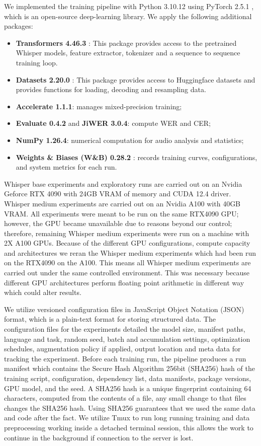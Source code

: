 {We implemented the training pipeline with Python 3.10.12 using PyTorch 2.5.1 \citep{Paszke2019}, which is an open-source deep-learning library. 
We apply the following additional packages:
\begin{itemize}
    \item \textbf{Transformers 4.46.3} \citep{Wolf2020}: This package provides access to the pretrained Whisper models, feature extractor, tokenizer and a sequence to sequence training loop.
    \item \textbf{Datasets 2.20.0} \citep{Lhoest2021}: This package provides access to Huggingface datasets and provides functions for loading, decoding and resampling data.
    \item \textbf{Accelerate 1.1.1}: manages mixed-precision training;
    \item \textbf{Evaluate 0.4.2} and \textbf{JiWER 3.0.4}: compute WER and CER;
    \item \textbf{NumPy 1.26.4}: numerical computation for audio analysis and
    statistics;
    \item \textbf{Weights \& Biases (W\&B) 0.28.2} \citep{Biewald2020}: records
    training curves, configurations, and system metrics for each run.
\end{itemize}Whisper base experiments and exploratory runs are carried out on an Nvidia Geforce RTX 4090 with 24GB VRAM of memory and CUDA 12.4 driver. Whisper medium experiments are carried out on an Nvidia A100 with 40GB VRAM. All experiments were meant to be run on the same RTX4090 GPU; however, the GPU became unavailable due to reasons beyond our control; therefore, remaining Whisper medium experiments were run on a machine with 2X A100 GPUs. Because of the different GPU configurations, compute capacity and architectures we reran the Whisper medium experiments which had been run on the RTX4090 on the A100. This means all Whisper medium experiments are carried out under the same controlled environment. This was necessary because different GPU architectures perform floating point arithmetic in different way which could alter results.

We utilize versioned configuration files in JavaScript Object Notation (JSON) format, which is a plain-text format for storing structured data. The configuration files for the experiments detailed the model size, manifest paths, language and task, random seed, batch and accumulation settings, optimization schedules, augmentation policy if applied, output location and meta data for tracking the experiment. Before each training run, the pipeline produces a run manifest which contains the Secure Hash Algorithm 256bit (SHA256) hash of the training script, configuration, dependency list, data manifests, package versions, GPU model, and the seed. A SHA256 hash is a unique fingerprint containing 64 characters, computed from the contents of a file, any small change to that files changes the SHA256 hash. Using SHA256 guarantees that we used the same data and code after the fact. We utilize Tmux to run long running training and data preprocessing working inside a detached terminal session, this allows the work to continue in the background if connection to the server is lost.

}
